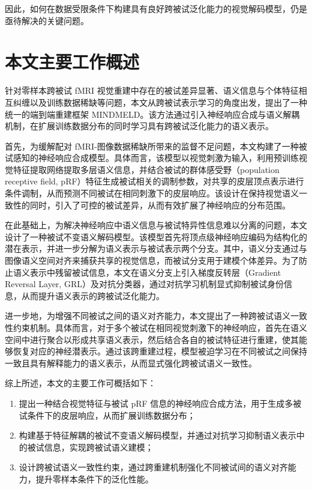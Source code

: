 因此，如何在数据受限条件下构建具有良好跨被试泛化能力的视觉解码模型，仍是亟待解决的关键问题。

\section{本文主要工作概述}

针对零样本跨被试 fMRI 视觉重建中存在的被试差异显著、语义信息与个体特征相互纠缠以及训练数据稀缺等问题，本文从跨被试表示学习的角度出发，提出了一种统一的端到端重建框架 MINDMELD。该方法通过引入神经响应合成与语义解耦机制，在扩展训练数据分布的同时学习具有跨被试泛化能力的语义表示。

首先，为缓解配对 fMRI-图像数据稀缺所带来的监督不足问题，本文构建了一种被试感知的神经响应合成模型。具体而言，该模型以视觉刺激为输入，利用预训练视觉特征提取网络提取多层语义信息，并结合被试的群体感受野（population receptive field, pRF）特征生成被试相关的调制参数，对共享的皮层顶点表示进行条件调制，从而预测不同被试在相同刺激下的皮层响应。该设计在保持视觉语义一致性的同时，引入了可控的被试差异，从而有效扩展了神经响应的分布范围。

在此基础上，为解决神经响应中语义信息与被试特异性信息难以分离的问题，本文设计了一种被试不变语义解码模型。该模型首先将顶点级神经响应编码为结构化的潜在表示，并进一步分解为语义表示与被试表示两个分支。其中，语义分支通过与图像语义空间对齐来捕获共享的视觉信息，而被试分支用于建模个体差异。为了防止语义表示中残留被试信息，本文在语义分支上引入梯度反转层（Gradient Reversal Layer, GRL）及对抗分类器，通过对抗学习机制显式抑制被试身份信息，从而提升语义表示的跨被试泛化能力。

进一步地，为增强不同被试之间的语义对齐能力，本文提出了一种跨被试语义一致性约束机制。具体而言，对于多个被试在相同视觉刺激下的神经响应，首先在语义空间中进行聚合以形成共享语义表示，然后结合各自的被试特征进行重建，使其能够恢复对应的神经潜表示。通过该跨重建过程，模型被迫学习在不同被试之间保持一致且具有解释能力的语义表示，从而显式强化跨被试语义一致性。

综上所述，本文的主要工作可概括如下：

\begin{enumerate}
  \item 提出一种结合视觉特征与被试 pRF 信息的神经响应合成方法，用于生成多被试条件下的皮层响应，从而扩展训练数据分布；
  \item 构建基于特征解耦的被试不变语义解码模型，并通过对抗学习抑制语义表示中的被试信息，实现跨被试语义建模；
  \item 设计跨被试语义一致性约束，通过跨重建机制强化不同被试间的语义对齐能力，提升零样本条件下的泛化性能。
\end{enumerate}

\chapterbib
